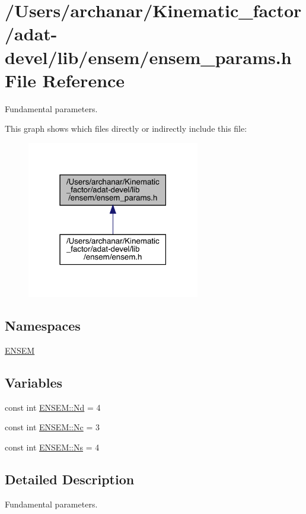 \hypertarget{adat-devel_2lib_2ensem_2ensem__params_8h}{}\section{/\+Users/archanar/\+Kinematic\+\_\+factor/adat-\/devel/lib/ensem/ensem\+\_\+params.h File Reference}
\label{adat-devel_2lib_2ensem_2ensem__params_8h}


Fundamental parameters.  


This graph shows which files directly or indirectly include this file\+:
\nopagebreak
\begin{figure}[H]
\begin{center}
\leavevmode
\includegraphics[width=214pt]{db/d7c/adat-devel_2lib_2ensem_2ensem__params_8h__dep__incl}
\end{center}
\end{figure}
\subsection*{Namespaces}
\begin{DoxyCompactItemize}
\item 
 \mbox{\hyperlink{namespaceENSEM}{E\+N\+S\+EM}}
\end{DoxyCompactItemize}
\subsection*{Variables}
\begin{DoxyCompactItemize}
\item 
const int \mbox{\hyperlink{namespaceENSEM_a016f024340c6231805f8b73f46b808dc}{E\+N\+S\+E\+M\+::\+Nd}} = 4
\item 
const int \mbox{\hyperlink{namespaceENSEM_aabe0c3018e0246aaae1602fa5c08b58a}{E\+N\+S\+E\+M\+::\+Nc}} = 3
\item 
const int \mbox{\hyperlink{namespaceENSEM_a6f05e048f9b2eb1a19131074f8abc25f}{E\+N\+S\+E\+M\+::\+Ns}} = 4
\end{DoxyCompactItemize}


\subsection{Detailed Description}
Fundamental parameters. 


